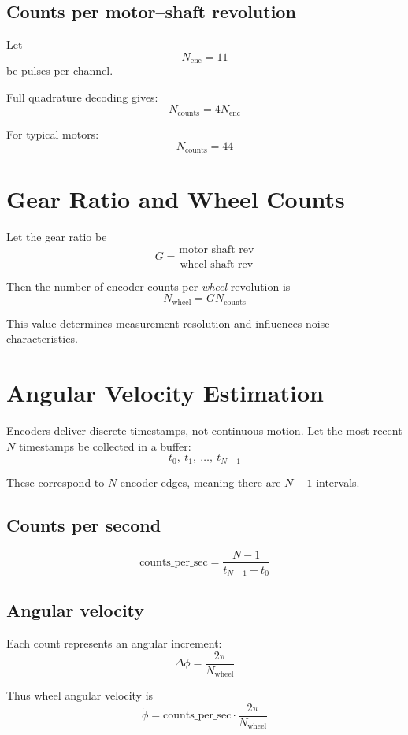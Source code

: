 \documentclass[11pt,a4paper]{article}
\begin{document}
\subsection*{Counts per motor--shaft revolution}

Let
\[
N_{\text{enc}} = 11
\]
be pulses per channel.  

Full quadrature decoding gives:
\[
N_{\text{counts}} = 4 N_{\text{enc}}
\]

For typical motors:
\[
N_{\text{counts}} = 44
\]

\section{Gear Ratio and Wheel Counts}

Let the gear ratio be
\[
G = \frac{\text{motor shaft rev}}{\text{wheel shaft rev}}
\]

Then the number of encoder counts per \emph{wheel} revolution is
\[
N_{\text{wheel}} = G N_{\text{counts}}
\]

This value determines measurement resolution and influences noise characteristics.

\section{Angular Velocity Estimation}

Encoders deliver discrete timestamps, not continuous motion.  
Let the most recent \( N \) timestamps be collected in a buffer:
\[
t_0,\ t_1,\ \dots,\ t_{N-1}
\]

These correspond to \( N \) encoder edges, meaning there are \( N-1 \) intervals.

\subsection*{Counts per second}

\[
\text{counts\_per\_sec} = \frac{N - 1}{t_{N-1} - t_0}
\]

\subsection*{Angular velocity}

Each count represents an angular increment:
\[
\Delta \phi = \frac{2\pi}{N_{\text{wheel}}}
\]

Thus wheel angular velocity is
\[
\dot{\phi} = \text{counts\_per\_sec} \cdot \frac{2\pi}{N_{\text{wheel}}}
\]
\end{document}
